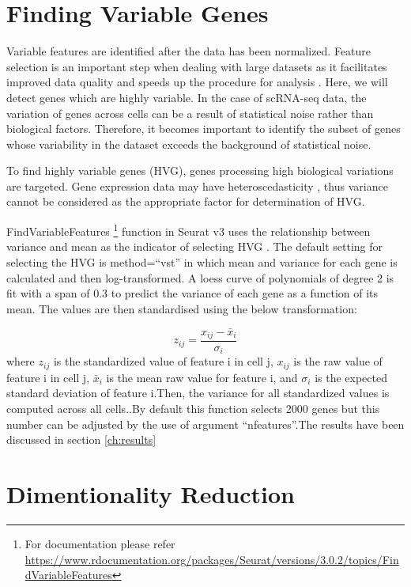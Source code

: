\documentclass{sydneythesis}
\begin{document}
\section{Finding Variable Genes}\label{sec:vg}

Variable features are identified after the data has been normalized.
Feature selection is an important step when dealing with large datasets
as it facilitates improved data quality and speeds up the procedure for
analysis \autocite{kursa2010feature}. Here, we will detect genes which
are highly variable. In the case of scRNA-seq data, the variation of
genes across cells can be a result of statistical noise rather than
biological factors\autocite{brennecke2013accounting}. Therefore, it
becomes important to identify the subset of genes whose variability in
the dataset exceeds the background of statistical noise.

To find highly variable genes (HVG), genes processing high biological
variations are targeted. Gene expression data may have
heteroscedasticity \autocite{yip2017linnorm}, thus variance cannot be
considered as the appropriate factor for determination of HVG.

FindVariableFeatures
\footnote{For documentation please refer \url{https://www.rdocumentation.org/packages/Seurat/versions/3.0.2/topics/FindVariableFeatures}}\label{refnote}
function in Seurat v3 uses the relationship between variance and mean as
the indicator of selecting HVG \autocite{yip2018evaluation}. The default
setting for selecting the HVG is method=``vst'' in which mean and
variance for each gene is calculated and then log-transformed. A loess
curve of polynomials of degree 2 is fit with a span of 0.3 to predict
the variance of each gene as a function of its mean. The values are then
standardised using the below transformation:

\[z_{ij}=\frac{{x_{ij}}-\bar{x}_i}{\sigma_i}\] where \(z_{ij}\) is the
standardized value of feature i in cell j, \(x_{ij}\) is the raw value
of feature i in cell j, \(\bar{x}_i\) is the mean raw value for feature
i, and \(\sigma_i\) is the expected standard deviation of feature
i.Then, the variance for all standardized values is computed across all
cells.\autocite{stuart2019comprehensive}.By default this function
selects 2000 genes but this number can be adjusted by the use of
argument ``nfeatures''.The results have been discussed
in section \ref{ch:results}

\section{Dimentionality Reduction}\label{sec:dm}
\end{document}
